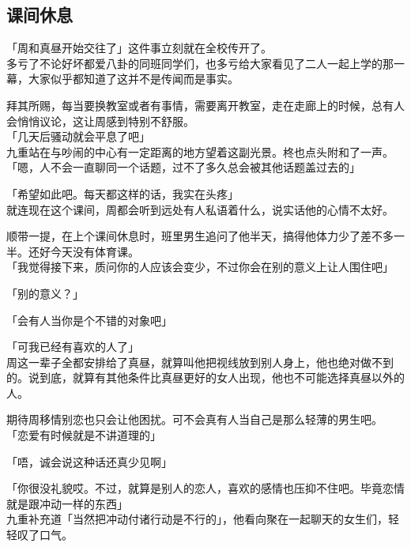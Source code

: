 \subsection{课间休息}

「周和真昼开始交往了」这件事立刻就在全校传开了。\\

多亏了不论好坏都爱八卦的同班同学们，也多亏给大家看见了二人一起上学的那一幕，大家似乎都知道了这并不是传闻而是事实。

拜其所赐，每当要换教室或者有事情，需要离开教室，走在走廊上的时候，总有人会悄悄议论，这让周感到特别不舒服。\\

「几天后骚动就会平息了吧」\\

九重站在与吵闹的中心有一定距离的地方望着这副光景。柊也点头附和了一声。\\

「嗯，人不会一直聊同一个话题，过不了多久总会被其他话题盖过去的」

「希望如此吧。每天都这样的话，我实在头疼」\\

就连现在这个课间，周都会听到远处有人私语着什么，说实话他的心情不太好。

顺带一提，在上个课间休息时，班里男生追问了他半天，搞得他体力少了差不多一半。还好今天没有体育课。\\

「我觉得接下来，质问你的人应该会变少，不过你会在别的意义上让人围住吧」

「别的意义？」

「会有人当你是个不错的对象吧」

「可我已经有喜欢的人了」\\

周这一辈子全都安排给了真昼，就算叫他把视线放到别人身上，他也绝对做不到的。说到底，就算有其他条件比真昼更好的女人出现，他也不可能选择真昼以外的人。

期待周移情别恋也只会让他困扰。可不会真有人当自己是那么轻薄的男生吧。\\

「恋爱有时候就是不讲道理的」

「唔，诚会说这种话还真少见啊」

「你很没礼貌哎。不过，就算是别人的恋人，喜欢的感情也压抑不住吧。毕竟恋情就是跟冲动一样的东西」\\

九重补充道「当然把冲动付诸行动是不行的」，他看向聚在一起聊天的女生们，轻轻叹了口气。\\

